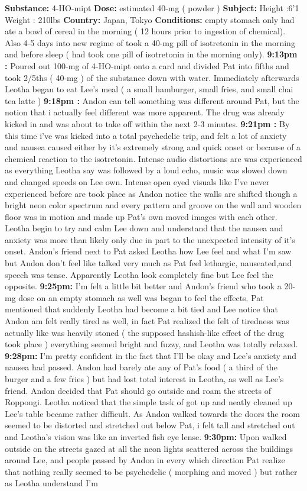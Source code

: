 \documentclass[12pt]{book}
\begin{document}
\textbf{Substance:} 4-HO-mipt \textbf{Dose:} estimated 40-mg ( powder ) \textbf{Subject:} Height :6'1 Weight : 210lbs \textbf{Country:} Japan, Tokyo \textbf{Conditions:} empty stomach only had ate a bowl of cereal in the morning ( 12 hours prior to ingestion of chemical). Also 4-5 days into new regime of took a 40-mg pill of isotretonin in the morning and before sleep ( had took one pill of isotretonin in the morning only). \textbf{9:13pm :} Poured out 100-mg of 4-HO-mipt onto a card and divided Pat into fifths and took 2/5ths ( 40-mg ) of the substance down with water. Immediately afterwards Leotha began to eat Lee's meal (  a small hamburger, small fries, and small chai tea latte ) \textbf{9:18pm :} Andon can tell something was different around Pat, but the notion that i actually feel different was more apparent. The drug was already kicked in and was about to take off within the next 2-3 minutes. \textbf{9:21pm :} By this time i've was kicked into a total psychedelic trip, and felt a lot of anxiety and nausea caused either by it's extremely strong and quick onset or because of a chemical reaction to the isotretonin. Intense audio distortions are was experienced as everything Leotha say was followed by a loud echo, music was slowed down and changed speeds on Lee own. Intense open eyed visuals like I've never experienced before are took place as Andon notice the walls are shifted though a bright neon color spectrum and every pattern and groove on the wall and wooden floor was in motion and made up Pat's own moved images with each other. Leotha begin to try and calm Lee down and understand that the nausea and anxiety was more than likely only due in part to the unexpected intensity of it's onset. Andon's friend next to Pat asked Leotha how Lee feel and what I'm saw but Andon don't feel like talked very much as Pat feel lethargic, nauseated,and speech was tense. Apparently Leotha look completely fine but Lee feel the opposite. \textbf{9:25pm:} I'm felt a little bit better and Andon's friend who took a 20-mg dose on an empty stomach as well was began to feel the effects. Pat mentioned that suddenly Leotha had become a bit tied and Lee notice that Andon am felt really tired as well, in fact Pat realized the felt of tiredness was actually like was heavily stoned ( the supposed hashish-like effect of the drug took place ) everything seemed bright and fuzzy, and Leotha was totally relaxed. \textbf{9:28pm:} I'm pretty confident in the fact that I'll be okay and Lee's anxiety and nausea had passed. Andon had barely ate any of Pat's food ( a third of the burger and a few fries ) but had lost total interest in Leotha, as well as Lee's friend. Andon decided that Pat should go outside and roam the streets of Roppongi. Leotha noticed that the simple task of got up and neatly cleaned up Lee's table became rather difficult. As Andon walked towards the doors the room seemed to be distorted and stretched out below Pat, i felt tall and stretched out and Leotha's vision was like an inverted fish eye lense. \textbf{9:30pm:} Upon walked outside on the streets gazed at all the neon lights scattered across the buildings around Lee, and people passed by Andon in every which direction Pat realize that nothing really seemed to be psychedelic ( morphing and moved ) but rather as Leotha understand I'm 
\end{document}

